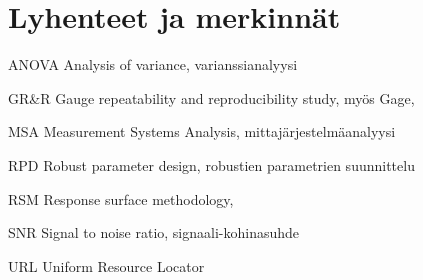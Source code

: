 \documentclass[12pt,a4paper,finnish]{tutthesis}
\begin{document}
\renewcommand\listfigurename{Kuvaluettelo}    %
\listoffigures                                 %
\markboth{}{}                                  %

\renewcommand\listtablename{Taulukkoluettelo} %
\listoftables                                  %
\markboth{}{}                                  %




%
%

\chapter*{Lyhenteet ja merkinnät}
\markboth{}{}                                %

\begin{termlist}
\item [ANOVA]      Analysis of variance, varianssianalyysi
\item [GR\&R] 	   Gauge repeatability and reproducibility study, myös Gage,
\item [MSA]        Measurement Systems Analysis, mittajärjestelmäanalyysi
\item [RPD]        Robust parameter design, robustien parametrien suunnittelu
\item [RSM]        Response surface methodology,
\item [SNR]        Signal to noise ratio, signaali-kohinasuhde
\item [URL]        Uniform Resource Locator
\end{termlist} 
\end{document}

